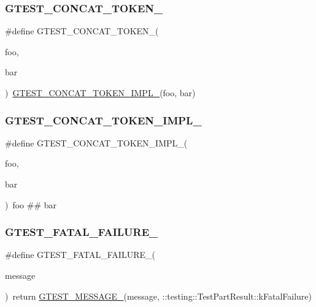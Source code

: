 \subsubsection{\texorpdfstring{GTEST\_CONCAT\_TOKEN\_}{GTEST\_CONCAT\_TOKEN\_}}
{\footnotesize\ttfamily \#define G\+T\+E\+S\+T\+\_\+\+C\+O\+N\+C\+A\+T\+\_\+\+T\+O\+K\+E\+N\+\_\+(\begin{DoxyParamCaption}\item[{}]{foo,  }\item[{}]{bar }\end{DoxyParamCaption})~\mbox{\hyperlink{gtest-internal_8h_aa39fb5346d3573feebe4257cb3a01fde}{G\+T\+E\+S\+T\+\_\+\+C\+O\+N\+C\+A\+T\+\_\+\+T\+O\+K\+E\+N\+\_\+\+I\+M\+P\+L\+\_\+}}(foo, bar)}

\mbox{\label{gtest-internal_8h_aa39fb5346d3573feebe4257cb3a01fde}} 
\subsubsection{\texorpdfstring{GTEST\_CONCAT\_TOKEN\_IMPL\_}{GTEST\_CONCAT\_TOKEN\_IMPL\_}}
{\footnotesize\ttfamily \#define G\+T\+E\+S\+T\+\_\+\+C\+O\+N\+C\+A\+T\+\_\+\+T\+O\+K\+E\+N\+\_\+\+I\+M\+P\+L\+\_\+(\begin{DoxyParamCaption}\item[{}]{foo,  }\item[{}]{bar }\end{DoxyParamCaption})~foo \#\# bar}

\mbox{\label{gtest-internal_8h_a0f9a4c3ea82cc7bf4478eaffdc168358}} 
\subsubsection{\texorpdfstring{GTEST\_FATAL\_FAILURE\_}{GTEST\_FATAL\_FAILURE\_}}
{\footnotesize\ttfamily \#define G\+T\+E\+S\+T\+\_\+\+F\+A\+T\+A\+L\+\_\+\+F\+A\+I\+L\+U\+R\+E\+\_\+(\begin{DoxyParamCaption}\item[{}]{message }\end{DoxyParamCaption})~return \mbox{\hyperlink{gtest-internal_8h_a94c73d5368ec946bc354d0992ad00810}{G\+T\+E\+S\+T\+\_\+\+M\+E\+S\+S\+A\+G\+E\+\_\+}}(message, \+::testing\+::\+Test\+Part\+Result\+::k\+Fatal\+Failure)}


